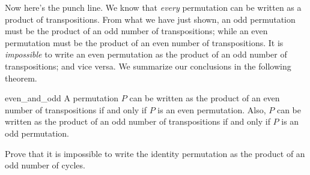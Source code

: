 Now here's the punch line. We know that \emph{every} permutation can be written as a product of transpositions. 
From what we have just shown, an odd permutation must be the product of an odd number of transpositions; while an even permutation must be the product of an even number of transpositions. It is \emph{impossible} to write an even permutation as the product of an odd number of transpositions; and vice versa. 
We summarize our conclusions in the following theorem.

\begin{prop}{even_and_odd}
A permutation $P$ can be written as the product of an even number of transpositions if and only if $P$ is an even permutation. 
Also,  $P$ can be written as the product of an odd number of transpositions if and only if $P$ is an odd permutation. 
\end{prop}


\begin{exercise}{}
Prove that it is impossible to write the identity permutation as the product of an odd number of cycles.
\end{exercise}




